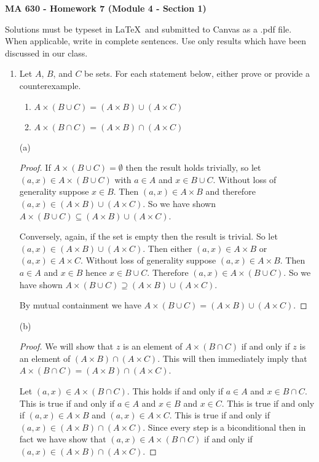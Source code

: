\documentclass[12pt]{article}
\begin{document}
\pagestyle{empty}

 {\noindent \textbf{\large MA 630 - Homework 7 (Module 4 - Section 1)}
\vspace{.25in}

\noindent Solutions must be typeset in \LaTeX \ and submitted to Canvas as a .pdf file. When applicable, write in complete sentences. Use only results which have been discussed in our class.
\vspace{.25in}

\begin{enumerate}
\item Let $A$, $B$, and $C$ be sets. For each statement below, either prove or provide a counterexample.
	\begin{enumerate}
	\item $A \times (B \cup C) = (A \times B) \cup (A \times C)$
	\item $A \times (B \cap C) = (A \times B) \cap (A \times C)$
	\end{enumerate}

(a)

  \begin{proof}
      If $A\times (B\cup C)=\emptyset$ then the result holds trivially, so let $(a,x)\in A\times (B\cup C)$ with $a\in A$ and $x\in B\cup C$.  Without loss of generality suppose $x\in B$.  Then $(a,x)\in A\times B$ and therefore $(a,x)\in (A\times B)\cup (A\times C)$.  So we have shown $A \times (B \cup C) \subseteq (A \times B) \cup (A \times C)$.

      Conversely, again, if the set is empty then the result is trivial.  So let $(a,x)\in (A\times B)\cup (A\times C)$.  Then either $(a,x)\in A\times B$ or $(a,x)\in A\times C$.  Without loss of generality suppose $(a,x)\in A\times B$.  Then $a\in A$ and $x\in B$ hence $x\in B\cup C$.  Therefore $(a,x)\in A\times (B\cup C)$.  So we have shown $A \times (B \cup C) \supseteq (A \times B) \cup (A \times C)$.

      By mutual containment we have $A \times (B \cup C) = (A \times B) \cup (A \times C)$.
  \end{proof}

  (b)

  \begin{proof}
    We will show that $z$ is an element of $A\times (B\cap C)$ if and only if $z$ is an element of $(A\times B)\cap (A\times C)$.  This will then immediately imply that $A\times (B\cap C)=(A\times B)\cap (A\times C)$.

    Let $(a,x)\in A\times (B\cap C)$.  This holds if and only if $a\in A$ and $x\in B\cap C$.  This is true if and only if $a\in A$ and $x\in B$ and $x\in C$.  This is true if and only if $(a,x)\in A\times B$ and $(a,x)\in A\times C$.  This is true if and only if $(a,x)\in (A\times B)\cap (A\times C)$.  Since every step is a biconditional then in fact we have show that $(a,x)\in A\times (B\cap C)$ if and only if $(a,x)\in (A\times B)\cap (A\times C)$.


\end{proof}
\end{enumerate}}
\end{document}
